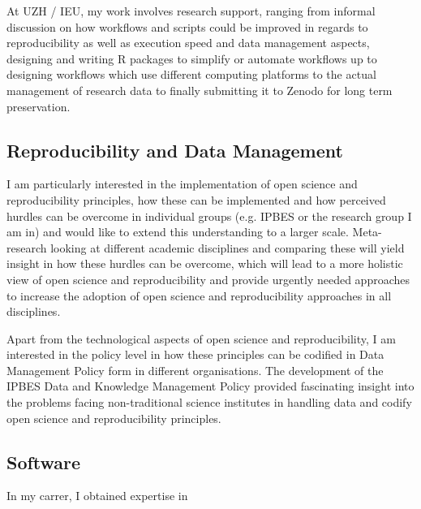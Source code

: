 \documentclass[a4paper]{article}
\begin{document}
At UZH / IEU, my work involves research support,
	ranging from informal discussion on how workflows and scripts could
	be improved in regards to reproducibility as well as execution speed
	and data management aspects, designing and writing R packages to
	simplify or automate workflows up to designing workflows which use
	different computing platforms to the actual management of research
	data to finally submitting it to Zenodo for long term preservation.


\subsection{Reproducibility and Data Management}

I am particularly interested in the implementation of open science and
	reproducibility principles, how these can be implemented and how
	perceived hurdles can be overcome in individual groups (e.g. IPBES or
	the research group I am in) and would like to extend this
	understanding to a larger scale. Meta-research looking at different
	academic disciplines and comparing these will yield insight in how
	these hurdles can be overcome, which will lead to a more holistic view 
	of open science and reproducibility and provide urgently needed 
	approaches to increase the adoption of open science and reproducibility 
	approaches in all disciplines.
	
Apart from the technological aspects of open science and reproducibility, 
  I am interested in the policy level in how these principles can be codified
  in Data Management Policy form in different organisations. The development
  of the IPBES Data and Knowledge Management Policy provided fascinating insight
  into the problems facing non-traditional science institutes in handling data 
  and codify open science and reproducibility principles.

\subsection{Software}

In my carrer, I obtained expertise in
\end{document}
